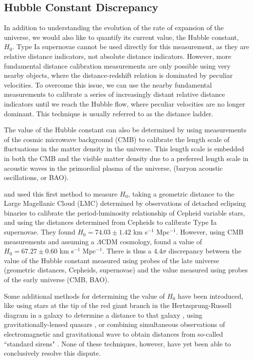 \subsection{Hubble Constant Discrepancy}
In addition to understanding the evolution of the rate of expansion of the universe, we would also like to quantify its current value, the Hubble constant, $H_0$. Type Ia supernovae cannot be used directly for this measurement, as they are relative distance indicators, not absolute distance indicators. However, more fundamental distance calibration measurements are only possible using very nearby objects, where the distance-redshift relation is dominated by peculiar velocities. To overcome this issue, we can use the nearby fundamental measurements to calibrate a series of increasingly distant relative distance indicators until we reach the Hubble flow, where peculiar velocities are no longer dominant. This technique is usually referred to as the distance ladder.

The value of the Hubble constant can also be determined by using measurements of the cosmic microwave background (CMB) to calibrate the length scale of fluctuations in the matter density in the universe. This length scale is embedded in both the CMB and the visible matter density due to a preferred length scale in acoustic waves in the primordial plasma of the universe, (baryon acoustic oscillations, or BAO).

\citet{riess_24_2016} and \citet{riess_large_2019} used this first method to measure $H_0$, taking a geometric distance to the Large Magellanic Cloud (LMC) determined by observations of detached eclipsing binaries to calibrate the period-luminosity relationship of Cepheid variable stars, and using the distances determined from Cepheids to calibrate Type Ia supernovae. They found $H_0=74.03 \pm 1.42$ km s$^{-1}$ Mpc$^{-1}$. However, using CMB measurements and assuming a $\Lambda$CDM cosmology, \citet{planck_collaboration_planck_2016} found a value of $H_0=67.27 \pm 0.60$ km s$^{-1}$ Mpc$^{-1}$. There is thus a $4.4\sigma$ discrepancy between the value of the Hubble constant measured using probes of the late universe (geometric distances, Cepheids, supernovae) and the value measured using probes of the early universe (CMB, BAO).

Some additional methods for determining the value of $H_0$ have been introduced, like using stars at the tip of the red giant branch in the Hertzsprung-Russell diagram in a galaxy to determine a distance to that galaxy \citep{freedman_calibration_2020}, using gravitationally-lensed quasars \citep{bonvin_h0licow_2017}, or combining simultaneous observations of electromagnetic and gravitational wave to obtain distances from so-called ``standard sirens" \citep{holz_using_2005}. None of these techniques, however, have yet been able to conclusively resolve this dispute.

